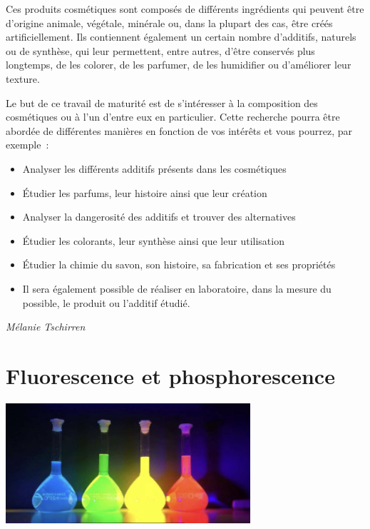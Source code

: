 \documentclass[
  10pt,
  french,
  a5paper,
  openany]{book}
\providecommand{\tightlist}{%
  \setlength{\itemsep}{0pt}\setlength{\parskip}{0pt}}
\newenvironment{signature}{\begin{flushright}}{\end{flushright}}
\begin{document}
Ces produits cosmétiques sont composés de différents ingrédients qui peuvent être d'origine animale, végétale, minérale ou, dans la plupart des cas, être créés artificiellement. Ils contiennent également un certain nombre d'additifs, naturels ou de synthèse, qui leur permettent, entre autres, d'être conservés plus longtemps, de les colorer, de les parfumer, de les humidifier ou d'améliorer leur texture.

\clearpage

Le but de ce travail de maturité est de s'intéresser à la composition des cosmétiques ou à l'un d'entre eux en particulier. Cette recherche pourra être abordée de différentes manières en fonction de vos intérêts et vous pourrez, par exemple~:

\begin{itemize}
\tightlist
\item
  Analyser les différents additifs présents dans les cosmétiques
\item
  Étudier les parfums, leur histoire ainsi que leur création
\item
  Analyser la dangerosité des additifs et trouver des alternatives
\item
  Étudier les colorants, leur synthèse ainsi que leur utilisation
\item
  Étudier la chimie du savon, son histoire, sa fabrication et ses propriétés
\item
  Il sera également possible de réaliser en laboratoire, dans la mesure du possible, le produit ou l'additif étudié.
\end{itemize}

\begin{signature}
\emph{Mélanie Tschirren}

\end{signature}

\hypertarget{fluorescence-et-phosphorescence}{%
\chapter{Fluorescence et phosphorescence}\label{fluorescence-et-phosphorescence}}

\begin{center}
\includegraphics[width=\textwidth,height=12em]{images/fluorescence-et-phosphorescence.jpg}

\end{center}
\end{document}

